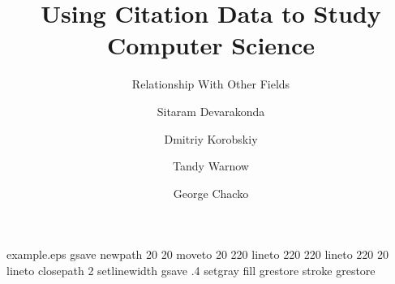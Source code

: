 %
%
%
%
%
\begin{filecontents*}{example.eps}
gsave
newpath
  20 20 moveto
  20 220 lineto
  220 220 lineto
  220 20 lineto
closepath
2 setlinewidth
gsave
  .4 setgray fill
grestore
stroke
grestore
\end{filecontents*}
%
\RequirePackage{fix-cm}
%
\documentclass[smallextended]{svjour3}       %
%
\smartqed  %
%
\usepackage{graphicx}
%
%
%
%
%


\title{Using Citation Data to Study Computer Science%
}
\subtitle{Relationship With Other Fields}


\author{Sitaram Devarakonda  \and
        Dmitriy Korobskiy \and
        Tandy Warnow \and
        George Chacko }


